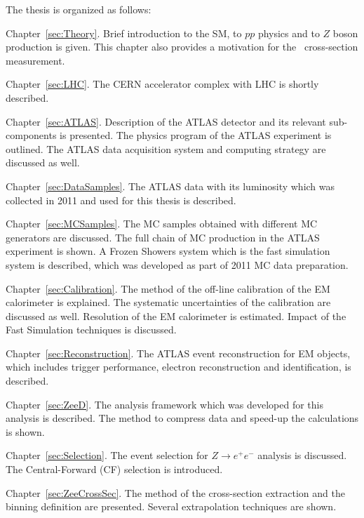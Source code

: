 The thesis is organized as follows:
\begin{description}
\item Chapter~\ref{sec:Theory}. Brief introduction to the SM, to $pp$ physics and to $Z$ boson production is given. This chapter also provides a motivation for the \Zee\ cross-section measurement.

\item Chapter~\ref{sec:LHC}. The CERN accelerator complex with LHC is shortly described.

\item Chapter~\ref{sec:ATLAS}. Description of the ATLAS detector and its relevant sub-components is presented. The physics program of the ATLAS experiment is outlined. The ATLAS data acquisition system and computing strategy are discussed as well.

\item Chapter~\ref{sec:DataSamples}. The ATLAS data with its luminosity which was collected in 2011 and used for this thesis is described.

\item Chapter~\ref{sec:MCSamples}. The MC samples obtained with different MC generators are discussed. The full chain of MC production in the ATLAS experiment is shown. A Frozen Showers system which is the fast simulation system is described, which was developed as part of 2011 MC data preparation.

\item Chapter~\ref{sec:Calibration}. The method of the off-line calibration of the EM calorimeter is explained. The systematic uncertainties of the calibration are discussed as well. Resolution of the EM calorimeter is estimated. Impact of the Fast Simulation techniques is discussed.

\item Chapter~\ref{sec:Reconstruction}. The ATLAS event reconstruction for EM objects, which includes trigger performance, electron reconstruction and identification, is described.

\item Chapter~\ref{sec:ZeeD}. The analysis framework which was developed for this analysis is described. The method to compress data and speed-up the calculations is shown.

\item Chapter~\ref{sec:Selection}. The event selection for $Z \to e^+e^-$ analysis is discussed. The Central-Forward (CF) selection is introduced.

\item Chapter~\ref{sec:ZeeCrossSec}. The method of the cross-section extraction and the binning definition are presented. Several extrapolation techniques are shown.


\end{description}
